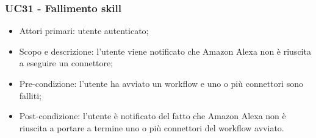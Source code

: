 \subsubsection{UC31 - Fallimento skill}
\begin{itemize}
	\item  Attori primari: utente autenticato;
	\item  Scopo e descrizione: l'utente viene notificato che Amazon Alexa non è riuscita a eseguire un connettore;
	\item  Pre-condizione: l'utente ha avviato un workflow e uno o più connettori sono falliti;
	\item  Post-condizione: l'utente è notificato del fatto che Amazon Alexa non è riuscita a portare a termine uno o più connettori del workflow avviato.
\end{itemize}